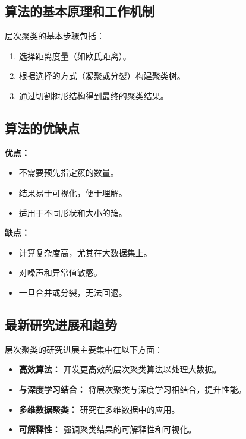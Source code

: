 \subsection*{算法的基本原理和工作机制}
层次聚类的基本步骤包括：
\begin{enumerate}
    \item 选择距离度量（如欧氏距离）。
    \item 根据选择的方式（凝聚或分裂）构建聚类树。
    \item 通过切割树形结构得到最终的聚类结果。
\end{enumerate}

\subsection*{算法的优缺点}
\textbf{优点：}
\begin{itemize}
    \item 不需要预先指定簇的数量。
    \item 结果易于可视化，便于理解。
    \item 适用于不同形状和大小的簇。
\end{itemize}

\textbf{缺点：}
\begin{itemize}
    \item 计算复杂度高，尤其在大数据集上。
    \item 对噪声和异常值敏感。
    \item 一旦合并或分裂，无法回退。
\end{itemize}

\subsection*{最新研究进展和趋势}
层次聚类的研究进展主要集中在以下方面：
\begin{itemize}
    \item \textbf{高效算法：} 开发更高效的层次聚类算法以处理大数据。
    \item \textbf{与深度学习结合：} 将层次聚类与深度学习相结合，提升性能。
    \item \textbf{多维数据聚类：} 研究在多维数据中的应用。
    \item \textbf{可解释性：} 强调聚类结果的可解释性和可视化。
\end{itemize}

